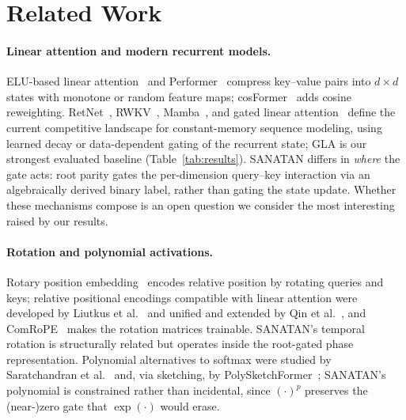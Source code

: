 \documentclass{article}
\begin{document}
\section{Related Work}
\label{sec:related}

\paragraph{Linear attention and modern recurrent models.} ELU-based linear attention~\cite{katharopoulos2020transformers} and Performer~\cite{choromanski2021rethinking} compress key--value pairs into $d \times d$ states with monotone or random feature maps; cosFormer~\cite{qin2022cosformer} adds cosine reweighting. RetNet~\cite{sun2023retnet}, RWKV~\cite{peng2023rwkv}, Mamba~\cite{gu2023mamba, gu2022efficiently}, and gated linear attention~\cite{yang2024gla} define the current competitive landscape for constant-memory sequence modeling, using learned decay or data-dependent gating of the recurrent state; GLA is our strongest evaluated baseline (Table~\ref{tab:results}). SANATAN differs in \emph{where} the gate acts: root parity gates the per-dimension query--key interaction via an algebraically derived binary label, rather than gating the state update. Whether these mechanisms compose is an open question we consider the most interesting raised by our results.

\paragraph{Rotation and polynomial activations.} Rotary position embedding~\cite{su2021roformer} encodes relative position by rotating queries and keys; relative positional encodings compatible with linear attention were developed by Liutkus et al.~\cite{liutkus2021spe} and unified and extended by Qin et al.~\cite{qin2023lrpe}, and ComRoPE~\cite{yu2025comrope} makes the rotation matrices trainable. SANATAN's temporal rotation is structurally related but operates inside the root-gated phase representation. Polynomial alternatives to softmax were studied by Saratchandran et al.~\cite{saratchandran2024rethinking} and, via sketching, by PolySketchFormer~\cite{kacham2023polysketchformer}; SANATAN's polynomial is constrained rather than incidental, since $(\cdot)^p$ preserves the (near-)zero gate that $\exp(\cdot)$ would erase.
\end{document}
